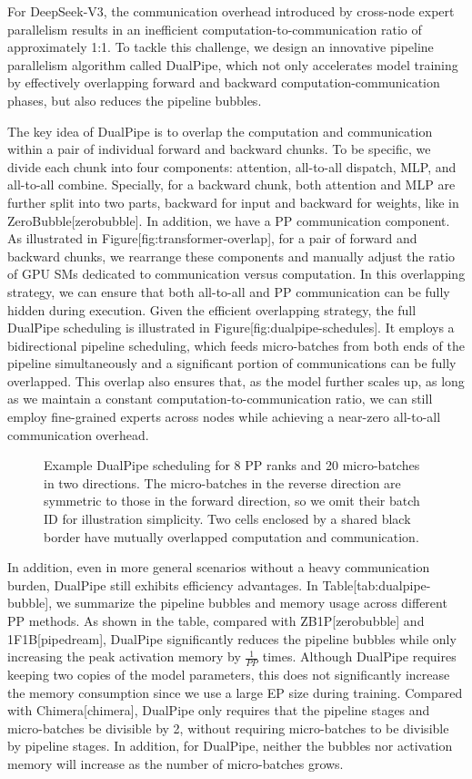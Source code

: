 \documentclass[11pt,a4paper]{article}
\begin{document}
For DeepSeek-V3, the communication overhead introduced by cross-node expert parallelism results in an inefficient computation-to-communication ratio of approximately 1:1. To tackle this challenge, we design an innovative pipeline parallelism algorithm called DualPipe, which not only accelerates model training by effectively overlapping forward and backward computation-communication phases, but also reduces the pipeline bubbles.

The key idea of DualPipe is to overlap the computation and communication within a pair of individual forward and backward chunks. To be specific, we divide each chunk into four components: attention, all-to-all dispatch, MLP, and all-to-all combine. Specially, for a backward chunk, both attention and MLP are further split into two parts, backward for input and backward for weights, like in ZeroBubble[zerobubble]. In addition, we have a PP communication component. As illustrated in Figure[fig:transformer-overlap], for a pair of forward and backward chunks, we rearrange these components and manually adjust the ratio of GPU SMs dedicated to communication versus computation. In this overlapping strategy, we can ensure that both all-to-all and PP communication can be fully hidden during execution. Given the efficient overlapping strategy, the full DualPipe scheduling is illustrated in Figure[fig:dualpipe-schedules]. It employs a bidirectional pipeline scheduling, which feeds micro-batches from both ends of the pipeline simultaneously and a significant portion of communications can be fully overlapped. This overlap also ensures that, as the model further scales up, as long as we maintain a constant computation-to-communication ratio, we can still employ fine-grained experts across nodes while achieving a near-zero all-to-all communication overhead.

\begin{figure}[h]
\caption{Example DualPipe scheduling for 8 PP ranks and 20 micro-batches in two directions. The micro-batches in the reverse direction are symmetric to those in the forward direction, so we omit their batch ID for illustration simplicity. Two cells enclosed by a shared black border have mutually overlapped computation and communication.}
\end{figure}

In addition, even in more general scenarios without a heavy communication burden, DualPipe still exhibits efficiency advantages. In Table[tab:dualpipe-bubble], we summarize the pipeline bubbles and memory usage across different PP methods. As shown in the table, compared with ZB1P[zerobubble] and 1F1B[pipedream], DualPipe significantly reduces the pipeline bubbles while only increasing the peak activation memory by $\frac{1}{PP}$ times. Although DualPipe requires keeping two copies of the model parameters, this does not significantly increase the memory consumption since we use a large EP size during training. Compared with Chimera[chimera], DualPipe only requires that the pipeline stages and micro-batches be divisible by 2, without requiring micro-batches to be divisible by pipeline stages. In addition, for DualPipe, neither the bubbles nor activation memory will increase as the number of micro-batches grows.
\end{document}
